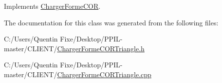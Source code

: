 Implements \hyperlink{class_charger_forme_c_o_r_a1d9563c3a1ff9d6d86aa87a83bdaf8da}{Charger\+Forme\+C\+OR}.



The documentation for this class was generated from the following files\+:\begin{DoxyCompactItemize}
\item 
C\+:/\+Users/\+Quentin Fixe/\+Desktop/\+P\+P\+I\+L-\/master/\+C\+L\+I\+E\+N\+T/\hyperlink{_charger_forme_c_o_r_triangle_8h}{Charger\+Forme\+C\+O\+R\+Triangle.\+h}\item 
C\+:/\+Users/\+Quentin Fixe/\+Desktop/\+P\+P\+I\+L-\/master/\+C\+L\+I\+E\+N\+T/\hyperlink{_charger_forme_c_o_r_triangle_8cpp}{Charger\+Forme\+C\+O\+R\+Triangle.\+cpp}\end{DoxyCompactItemize}
